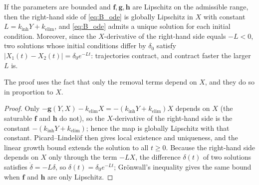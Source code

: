 \begin{proposition}
\label{prop:B_existence}
If the parameters are bounded and $\mathbf{f},\mathbf{g},\mathbf{h}$ are
Lipschitz \citep{coddington_levinson_1955} on the admissible range, then the right-hand side of \eqref{eq:B_ode}
is globally Lipschitz in $X$ with constant $L=k_{\text{inh}}Y+k_{\text{elim}}$, and
\eqref{eq:B_ode} admits a unique solution for each initial condition. Moreover,
since the $X$-derivative of the right-hand side equals $-L<0$, two solutions
whose initial conditions differ by $\delta_0$ satisfy
$|X_1(t)-X_2(t)|=\delta_0e^{-Lt}$: trajectories contract, and contract faster
the larger $L$ is.
\end{proposition}
The proof uses the fact that only the removal terms depend on $X$, and they do
so in proportion to $X$.
\begin{proof}
Only $-\mathbf{g}(Y,X)-k_{\text{elim}}X=-(k_{\text{inh}}Y+k_{\text{elim}})X$
depends on $X$ (the saturable $\mathbf{f}$ and $\mathbf{h}$ do not), so the
$X$-derivative of the right-hand side is the constant
$-(k_{\text{inh}}Y+k_{\text{elim}})$; hence the map is globally Lipschitz with
that constant. Picard--Lindel\"of then gives local existence and uniqueness, and
the linear growth bound extends the solution to all $t\ge0$. Because the
right-hand side depends on $X$ only through the term $-LX$, the difference
$\delta(t)$ of two solutions satisfies $\dot\delta=-L\delta$, so
$\delta(t)=\delta_0e^{-Lt}$; Gr\"onwall's inequality \citep{gronwall_1919}
gives the same bound when $\mathbf{f}$ and $\mathbf{h}$ are only Lipschitz.
\end{proof}

